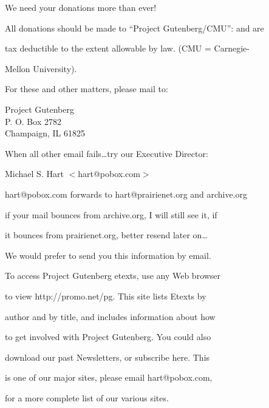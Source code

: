 \documentclass[12pt]{book}
\begin{document}
We need your donations more than ever!





All donations should be made to ``Project Gutenberg/CMU'': and are

tax deductible to the extent allowable by law.  (CMU = Carnegie-

Mellon University).



For these and other matters, please mail to:



\begin{center}

Project Gutenberg \\

P. O. Box  2782 \\

Champaign, IL 61825

\end{center}



When all other email fails\ldots try our Executive Director:

Michael S. Hart $<$hart@pobox.com$>$

hart@pobox.com forwards to hart@prairienet.org and \newline archive.org

if your mail bounces from archive.org, I will still see it, if

it bounces from prairienet.org, better resend later on\ldots



We would prefer to send you this information by email.



\newpage



To access Project Gutenberg etexts, use any Web browser

to view \newline http://promo.net/pg.  This site lists Etexts by

author and by title, and includes information about how

to get involved with Project Gutenberg.  You could also

download our past Newsletters, or subscribe here.  This

is one of our major sites, please email hart@pobox.com,

for a more complete list of our various sites.
\end{document}
